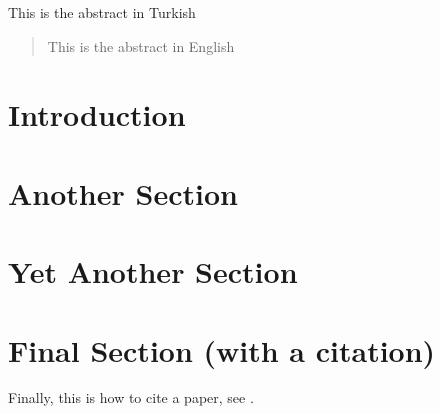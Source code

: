 \documentclass[12pt]{article}
\begin{document}

\frontpage
\contentpage

\begin{ozet}
    This is the abstract in Turkish
\end{ozet}
\begin{abstract}
    This is the abstract in English
\end{abstract}

\section{Introduction}
\lipsum[1-10]
\section{Another Section}
\lipsum[1-5]
\section{Yet Another Section}
\lipsum[1-3]

\section{Final Section (with a citation)}
\lipsum[1-3]
Finally, this is how to cite a paper, see \cite{Breuer2017}.

\end{document}
